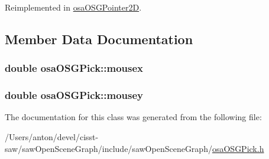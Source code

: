 Reimplemented in \hyperlink{classosa_o_s_g_pointer2_d_a23023fdd12565643645cc74436f19150}{osa\+O\+S\+G\+Pointer2\+D}.



\subsection{Member Data Documentation}
\hypertarget{classosa_o_s_g_pick_a6a873ebac73e6a50727bf6899f4d3ba9}{}
\subsubsection[{mousex}]{\setlength{\rightskip}{0pt plus 5cm}double osa\+O\+S\+G\+Pick\+::mousex\hspace{0.3cm}{\ttfamily [protected]}}\label{classosa_o_s_g_pick_a6a873ebac73e6a50727bf6899f4d3ba9}
\hypertarget{classosa_o_s_g_pick_a0ff8d75903e0ff5611df44df27d2b374}{}
\subsubsection[{mousey}]{\setlength{\rightskip}{0pt plus 5cm}double osa\+O\+S\+G\+Pick\+::mousey\hspace{0.3cm}{\ttfamily [protected]}}\label{classosa_o_s_g_pick_a0ff8d75903e0ff5611df44df27d2b374}


The documentation for this class was generated from the following file\+:\begin{DoxyCompactItemize}
\item 
/\+Users/anton/devel/cisst-\/saw/saw\+Open\+Scene\+Graph/include/saw\+Open\+Scene\+Graph/\hyperlink{osa_o_s_g_pick_8h}{osa\+O\+S\+G\+Pick.\+h}\end{DoxyCompactItemize}
